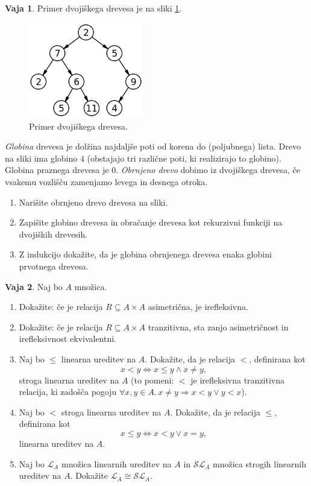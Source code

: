 \documentclass{article}
\newcommand{\all}[1]{\forall #1 .\,}
\newcommand{\lthen}{\Rightarrow}
\theoremstyle{definition}
\newtheorem{vaja}{Vaja}
\begin{document}
\begin{vaja}
	Primer dvojiškega drevesa je na sliki \ref{fig:drevo}.
	\begin{figure}[!ht]
		\centering
		\includegraphics[width = 5cm]{Binary_tree.png}
		\caption{Primer dvojiškega drevesa.}
		\label{fig:drevo}
	\end{figure}
	
	\emph{Globina} drevesa je dolžina najdaljše poti od korena do (poljubnega) lista. Drevo na sliki ima globino $4$ (obstajajo tri različne poti, ki realizirajo to globino). Globina praznega drevesa je 0.  
	\emph{Obrnjeno drevo} dobimo iz dvojiškega drevesa, če vsakemu vozlišču zamenjamo levega in desnega otroka. 
	\begin{enumerate}
		\item Narišite obrnjeno drevo drevesa na sliki.
		\item Zapišite globino drevesa in obračanje drevesa kot rekurzivni funkciji na dvojiških drevesih.
		\item Z indukcijo dokažite, da je globina obrnjenega drevesa enaka globini prvotnega drevesa. 
	\end{enumerate}
\end{vaja}

\begin{vaja}
  Naj bo $A$ množica.
  \begin{enumerate}
    \item
      Dokažite: če je relacija $R \subseteq A \times A$ asimetrična, je irefleksivna.
    \item
      Dokažite: če je relacija $R \subseteq A \times A$ tranzitivna, sta zanjo asimetričnost in irefleksivnost ekvivalentni.
    \item
      Naj bo $\leq$ linearna ureditev na $A$. Dokažite, da je relacija $<$, definirana kot
      \[x < y \iff x \leq y \land x \neq y,\]
      stroga linearna ureditev na $A$ (to pomeni: $<$ je irefleksivna tranzitivna relacija, ki zadošča pogoju $\all{x, y \in A}{x \neq y \lthen x < y \lor y < x}$).
    \item
      Naj bo $<$ stroga linearna ureditev na $A$. Dokažite, da je relacija $\leq$, definirana kot
      \[x \leq y \iff x < y \lor x = y,\]
      linearna ureditev na $A$.
    \item
      Naj bo $\mathcal{L}_A$ množica linearnih ureditev na $A$ in $\mathcal{SL}_A$ množica strogih linearnih ureditev na $A$. Dokažite $\mathcal{L}_A \cong \mathcal{SL}_A$.
  \end{enumerate}
\end{vaja}
\end{document}
